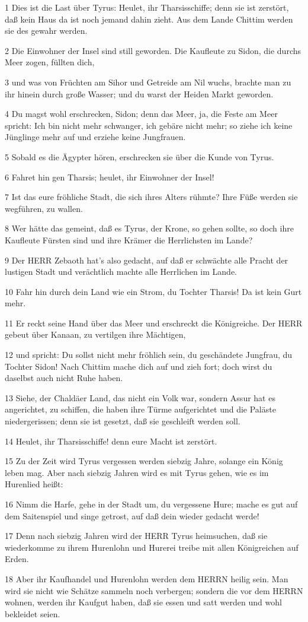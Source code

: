 \par 1 Dies ist die Last über Tyrus: Heulet, ihr Tharsisschiffe; denn sie ist zerstört, daß kein Haus da ist noch jemand dahin zieht. Aus dem Lande Chittim werden sie des gewahr werden.
\par 2 Die Einwohner der Insel sind still geworden. Die Kaufleute zu Sidon, die durchs Meer zogen, füllten dich,
\par 3 und was von Früchten am Sihor und Getreide am Nil wuchs, brachte man zu ihr hinein durch große Wasser; und du warst der Heiden Markt geworden.
\par 4 Du magst wohl erschrecken, Sidon; denn das Meer, ja, die Feste am Meer spricht: Ich bin nicht mehr schwanger, ich gebäre nicht mehr; so ziehe ich keine Jünglinge mehr auf und erziehe keine Jungfrauen.
\par 5 Sobald es die Ägypter hören, erschrecken sie über die Kunde von Tyrus.
\par 6 Fahret hin gen Tharsis; heulet, ihr Einwohner der Insel!
\par 7 Ist das eure fröhliche Stadt, die sich ihres Alters rühmte? Ihre Füße werden sie wegführen, zu wallen.
\par 8 Wer hätte das gemeint, daß es Tyrus, der Krone, so gehen sollte, so doch ihre Kaufleute Fürsten sind und ihre Krämer die Herrlichsten im Lande?
\par 9 Der HERR Zebaoth hat's also gedacht, auf daß er schwächte alle Pracht der lustigen Stadt und verächtlich machte alle Herrlichen im Lande.
\par 10 Fahr hin durch dein Land wie ein Strom, du Tochter Tharsis! Da ist kein Gurt mehr.
\par 11 Er reckt seine Hand über das Meer und erschreckt die Königreiche. Der HERR gebeut über Kanaan, zu vertilgen ihre Mächtigen,
\par 12 und spricht: Du sollst nicht mehr fröhlich sein, du geschändete Jungfrau, du Tochter Sidon! Nach Chittim mache dich auf und zieh fort; doch wirst du daselbst auch nicht Ruhe haben.
\par 13 Siehe, der Chaldäer Land, das nicht ein Volk war, sondern Assur hat es angerichtet, zu schiffen, die haben ihre Türme aufgerichtet und die Paläste niedergerissen; denn sie ist gesetzt, daß sie geschleift werden soll.
\par 14 Heulet, ihr Tharsisschiffe! denn eure Macht ist zerstört.
\par 15 Zu der Zeit wird Tyrus vergessen werden siebzig Jahre, solange ein König leben mag. Aber nach siebzig Jahren wird es mit Tyrus gehen, wie es im Hurenlied heißt:
\par 16 Nimm die Harfe, gehe in der Stadt um, du vergessene Hure; mache es gut auf dem Saitenspiel und singe getrost, auf daß dein wieder gedacht werde!
\par 17 Denn nach siebzig Jahren wird der HERR Tyrus heimsuchen, daß sie wiederkomme zu ihrem Hurenlohn und Hurerei treibe mit allen Königreichen auf Erden.
\par 18 Aber ihr Kaufhandel und Hurenlohn werden dem HERRN heilig sein. Man wird sie nicht wie Schätze sammeln noch verbergen; sondern die vor dem HERRN wohnen, werden ihr Kaufgut haben, daß sie essen und satt werden und wohl bekleidet seien.


